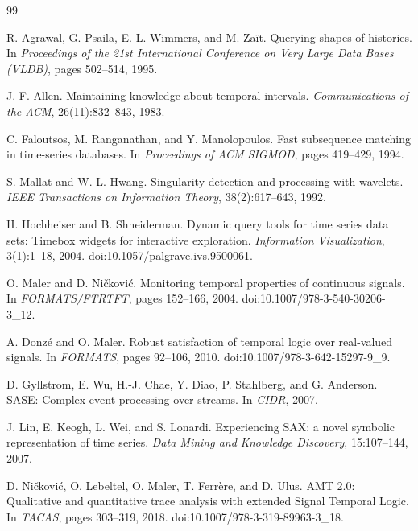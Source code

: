 \begin{thebibliography}{99}

R. Agrawal, G. Psaila, E. L. Wimmers, and M. Za\"it.
\newblock Querying shapes of histories.
\newblock In \emph{Proceedings of the 21st International Conference on Very Large Data Bases (VLDB)}, pages 502--514, 1995.

J. F. Allen.
\newblock Maintaining knowledge about temporal intervals.
\newblock \emph{Communications of the ACM}, 26(11):832--843, 1983.

C. Faloutsos, M. Ranganathan, and Y. Manolopoulos.
\newblock Fast subsequence matching in time-series databases.
\newblock In \emph{Proceedings of ACM SIGMOD}, pages 419--429, 1994.

S. Mallat and W. L. Hwang.
\newblock Singularity detection and processing with wavelets.
\newblock \emph{IEEE Transactions on Information Theory}, 38(2):617--643, 1992.

H. Hochheiser and B. Shneiderman.
\newblock Dynamic query tools for time series data sets: Timebox widgets for interactive exploration.
\newblock \emph{Information Visualization}, 3(1):1--18, 2004. doi:10.1057/palgrave.ivs.9500061.

O. Maler and D. Ni\v{c}kovi\'c.
\newblock Monitoring temporal properties of continuous signals.
\newblock In \emph{FORMATS/FTRTFT}, pages 152--166, 2004. doi:10.1007/978-3-540-30206-3\_12.

A. Donz\'e and O. Maler.
\newblock Robust satisfaction of temporal logic over real-valued signals.
\newblock In \emph{FORMATS}, pages 92--106, 2010. doi:10.1007/978-3-642-15297-9\_9.

D. Gyllstrom, E. Wu, H.-J. Chae, Y. Diao, P. Stahlberg, and G. Anderson.
\newblock SASE: Complex event processing over streams.
\newblock In \emph{CIDR}, 2007.

J. Lin, E. Keogh, L. Wei, and S. Lonardi.
\newblock Experiencing SAX: a novel symbolic representation of time series.
\newblock \emph{Data Mining and Knowledge Discovery}, 15:107--144, 2007.

D. Ni\v{c}kovi\'c, O. Lebeltel, O. Maler, T. Ferr\`ere, and D. Ulus.
\newblock AMT 2.0: Qualitative and quantitative trace analysis with extended Signal Temporal Logic.
\newblock In \emph{TACAS}, pages 303--319, 2018. doi:10.1007/978-3-319-89963-3\_18.


\end{thebibliography}
